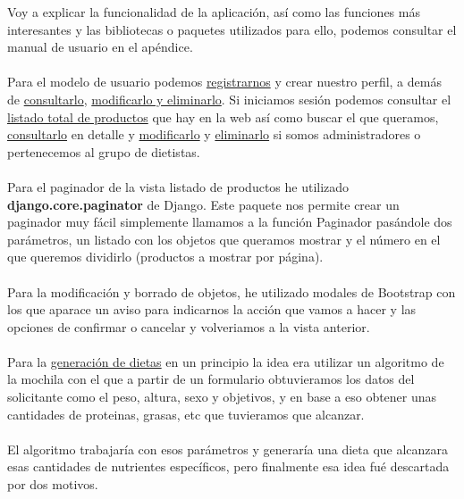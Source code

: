 Voy a explicar la funcionalidad de la aplicación, así como las funciones más interesantes y las bibliotecas o paquetes utilizados para ello, podemos consultar el manual de usuario en el apéndice. \\ \\

Para el modelo de usuario podemos \href{https://github.com/josemip98/TFG/issues/4}{registrarnos} y crear nuestro perfil, a demás de \href{https://github.com/josemip98/TFG/issues/21}{consultarlo}, \href{https://github.com/josemip98/TFG/issues/11}{modificarlo y eliminarlo}.
Si iniciamos sesión podemos consultar el \href{https://github.com/josemip98/TFG/issues/2}{listado total de productos} que hay en la web así como buscar el que queramos, \href{https://github.com/josemip98/TFG/issues/3}{consultarlo} en detalle y
\href{https://github.com/josemip98/TFG/issues/8}{modificarlo} y \href{https://github.com/josemip98/TFG/issues/9}{eliminarlo} si somos administradores o pertenecemos al grupo de dietistas.\\ \\

Para el paginador de la vista listado de productos he utilizado \textbf{django.core.paginator} de Django. Este paquete nos permite crear 
un paginador muy fácil simplemente llamamos a la función Paginador pasándole dos parámetros, un listado con los objetos que 
queramos mostrar y el número en el que queremos dividirlo (productos a mostrar por página). \\ \\

Para la modificación y borrado de objetos, he utilizado modales de Bootstrap con los que aparace un aviso para indicarnos la acción que vamos a hacer y las opciones de confirmar o cancelar y volveriamos a la vista anterior.\\ \\

Para la \href{https://github.com/josemip98/TFG/issues/12}{generación de dietas} en un principio la idea era utilizar un algoritmo de la mochila con el que a partir de un formulario obtuvieramos los datos del solicitante
como el peso, altura, sexo y objetivos, y en base a eso obtener unas cantidades de proteinas, grasas, etc que tuvieramos que alcanzar.\\ \\

El algoritmo trabajaría con esos parámetros y generaría una dieta que alcanzara esas cantidades de nutrientes específicos, pero finalmente esa idea fué descartada por dos motivos.\\\\

